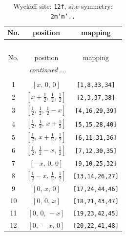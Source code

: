 \documentclass[fleqn,8pt]{jsarticle}
\begin{document}
\begin{longtable}{ccc}
\caption{Wyckoff site: {\tt 12f}, site symmetry: {\tt 2m'm'..}}
 \\
 \hline \hline
No. & position & mapping \\ \hline \endfirsthead

\multicolumn{2}{l}{\tablename\ \thetable{}} \\
 \hline \hline
No. & position & mapping \\ \hline \endhead

 \hline \hline
\multicolumn{2}{r}{\footnotesize\it continued ...} \\ \endfoot

 \hline \hline
\multicolumn{2}{r}{} \\ \endlastfoot

1 & $\left[ x,\, 0,\, 0 \right]$ & {\tt [1,8,33,34]} \\ \hline
2 & $\left[ x + \frac{1}{2},\, \frac{1}{2},\, \frac{1}{2} \right]$ & {\tt [2,3,37,38]} \\ \hline
3 & $\left[ \frac{1}{2},\, \frac{1}{2},\, \frac{1}{2} - x \right]$ & {\tt [4,16,29,39]} \\ \hline
4 & $\left[ \frac{1}{2},\, \frac{1}{2},\, x + \frac{1}{2} \right]$ & {\tt [5,15,28,40]} \\ \hline
5 & $\left[ \frac{1}{2},\, x + \frac{1}{2},\, \frac{1}{2} \right]$ & {\tt [6,11,31,36]} \\ \hline
6 & $\left[ \frac{1}{2},\, \frac{1}{2} - x,\, \frac{1}{2} \right]$ & {\tt [7,12,30,35]} \\ \hline
7 & $\left[ - x,\, 0,\, 0 \right]$ & {\tt [9,10,25,32]} \\ \hline
8 & $\left[ \frac{1}{2} - x,\, \frac{1}{2},\, \frac{1}{2} \right]$ & {\tt [13,14,26,27]} \\ \hline
9 & $\left[ 0,\, x,\, 0 \right]$ & {\tt [17,24,44,46]} \\ \hline
10 & $\left[ 0,\, 0,\, x \right]$ & {\tt [18,21,43,47]} \\ \hline
11 & $\left[ 0,\, 0,\, - x \right]$ & {\tt [19,23,42,45]} \\ \hline
12 & $\left[ 0,\, - x,\, 0 \right]$ & {\tt [20,22,41,48]} \\
\end{longtable}
\renewcommand{\arraystretch}{1.2}
\end{document}
